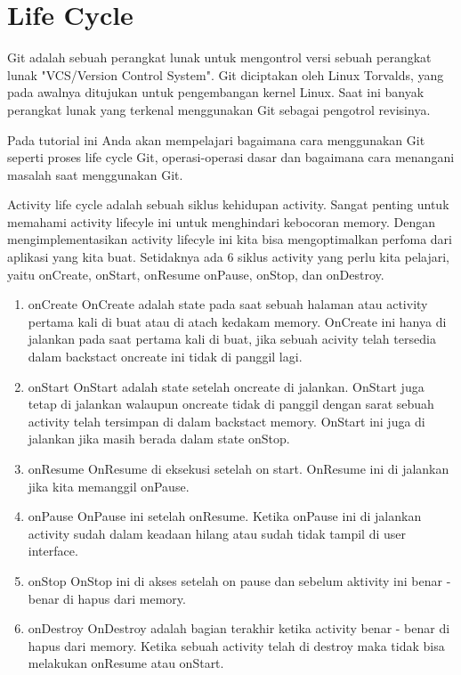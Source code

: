 \sloppy
\section{Life Cycle}
\vspace{12pt}
\noindent 
Git adalah sebuah perangkat lunak untuk mengontrol versi sebuah perangkat lunak "VCS/Version Control System". Git diciptakan oleh Linux Torvalds, yang pada awalnya ditujukan untuk pengembangan kernel Linux. Saat ini banyak perangkat lunak yang terkenal menggunakan Git sebagai pengotrol revisinya. \par
\vspace{12pt}
\noindent 
Pada tutorial ini Anda akan mempelajari bagaimana cara menggunakan Git seperti proses life cycle Git, operasi-operasi dasar dan bagaimana cara menangani masalah saat menggunakan Git. \par
\vspace{12pt}
\noindent 
Activity life cycle adalah sebuah siklus kehidupan activity. Sangat penting untuk memahami activity lifecyle ini untuk menghindari kebocoran memory. Dengan mengimplementasikan activity lifecyle ini kita bisa mengoptimalkan perfoma dari aplikasi yang kita buat. Setidaknya ada 6 siklus activity yang perlu kita pelajari, yaitu $  $onCreate, onStart, onResume onPause, onStop, dan onDestroy.
\begin{enumerate}
	\item onCreate OnCreate adalah state pada saat sebuah halaman atau activity pertama kali di buat atau di atach kedakam memory. OnCreate ini hanya di jalankan pada saat pertama kali di buat, jika sebuah acivity telah tersedia dalam backstact oncreate ini tidak di panggil lagi.
	\item onStart OnStart adalah state setelah oncreate di jalankan. OnStart juga tetap di jalankan walaupun oncreate tidak di panggil dengan sarat sebuah activity telah tersimpan di dalam backstact memory. OnStart ini juga di jalankan jika masih berada dalam state onStop.
	\item onResume OnResume di eksekusi setelah on start. OnResume ini di jalankan jika kita memanggil onPause.
	\item onPause OnPause ini setelah onResume. Ketika onPause ini di jalankan activity sudah dalam keadaan hilang atau sudah tidak tampil di user interface.
	\item onStop OnStop ini di akses setelah on pause dan sebelum aktivity ini benar - benar di hapus dari memory.
	\item onDestroy OnDestroy adalah bagian terakhir ketika activity benar - benar di hapus dari memory. Ketika sebuah activity telah di destroy maka tidak bisa melakukan onResume atau onStart.
\end{enumerate}
   

